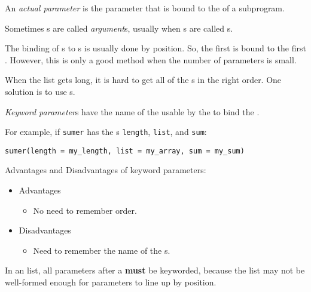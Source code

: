 \begin{definition}\label{def:Actual_Parameter}
  An \emph{actual parameter} is the parameter that is bound to the  of a subprogram.
  
  \begin{remark}[Argument]\label{rmk:Argument}
    Sometimes s are called \emph{argument}s, usually when s are called s.
  \end{remark}
\end{definition}

The binding of s to s is usually done by position.
So, the first  is bound to the first .
However, this is only a good method when the number of parameters is small.

When the  list gets long, it is hard to get all of the s in the right order.
One solution is to use s.

\begin{definition}\label{def:Keyword_Parameter}
  \emph{Keyword parameter}s have the name of the  usable by the  to bind the .

  For example, if \texttt{sumer} has the s \texttt{length}, \texttt{list}, and \texttt{sum}:
\begin{verbatim}
sumer(length = my_length, list = my_array, sum = my_sum)
\end{verbatim}

  Advantages and Disadvantages of keyword parameters:
  \begin{itemize}[noitemsep]
  \item Advantages
    \begin{itemize}[noitemsep]
    \item No need to remember  order.
    \end{itemize}
  \item Disadvantages
    \begin{itemize}[noitemsep]
    \item Need to remember the name of the s.
    \end{itemize}
  \end{itemize}

  \begin{remark}\label{rmk:Keyword_Parameters_at_End}
    In an  list, all parameters after a  \textbf{must} be keyworded, because the list may not be well-formed enough for parameters to line up by position.
  \end{remark}
\end{definition}

